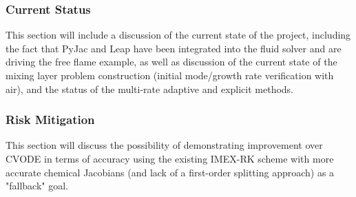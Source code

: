 \subsubsection{Current Status}

This section will include a discussion of the current state of the project,
including the fact that PyJac and Leap have been integrated into the fluid
solver and are driving the free flame example, as well as discussion of the
current state of the mixing layer problem construction (initial mode/growth
rate verification with air), and the status of the multi-rate adaptive and
explicit methods.

\subsubsection{Risk Mitigation}

This section will discuss the possibility of demonstrating improvement
over CVODE in terms of accuracy using the existing IMEX-RK scheme with
more accurate chemical Jacobians (and lack of a first-order splitting
approach) as a "fallback" goal.

